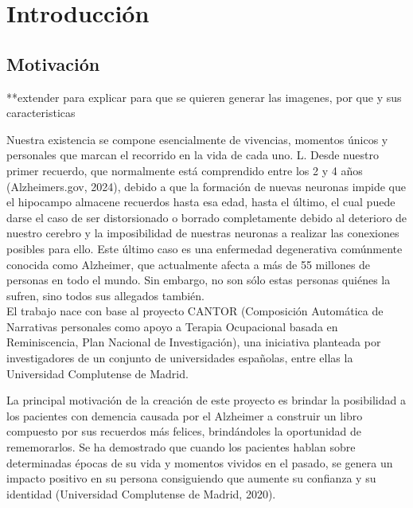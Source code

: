 \chapter{Introducción}
\label{cap:introduccion}


\section{Motivación}

**extender para explicar para que se quieren generar las imagenes, por que y sus caracteristicas

Nuestra existencia se compone esencialmente de vivencias, momentos únicos y personales que marcan el recorrido en la vida de cada uno. L. Desde nuestro primer recuerdo, que normalmente está comprendido entre los 2 y 4 años (Alzheimers.gov, 2024), debido a que la formación de nuevas neuronas impide que el hipocampo almacene recuerdos hasta esa edad, hasta el último, el cual puede darse el caso de ser distorsionado o borrado completamente debido al deterioro de nuestro cerebro y la imposibilidad de nuestras neuronas a realizar las conexiones posibles para ello. Este último caso es una enfermedad degenerativa comúnmente conocida como Alzheimer, que actualmente afecta a más de 55 millones de personas en todo el mundo. Sin embargo, no son sólo estas personas quiénes la sufren, sino todos sus allegados también. \\

El trabajo nace con base al proyecto CANTOR (Composición Automática de Narrativas personales como apoyo a Terapia Ocupacional basada en Reminiscencia, Plan Nacional de Investigación), una iniciativa planteada por investigadores de un conjunto de universidades españolas, entre ellas la Universidad Complutense de Madrid.

La principal motivación de la creación de este proyecto es brindar la posibilidad a los pacientes con demencia causada por el Alzheimer a construir un libro compuesto por sus recuerdos más felices, brindándoles la oportunidad de rememorarlos. Se ha demostrado que cuando los pacientes hablan sobre determinadas épocas de su vida y momentos vividos en el pasado, se genera un impacto positivo en su persona consiguiendo que aumente su confianza y su identidad (Universidad Complutense de Madrid, 2020).\\

